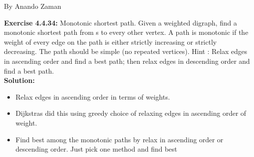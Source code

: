 \documentclass[11pt,fleqn]{article}
\begin{document}
By Anando Zaman


\textbf{Exercise 4.4.34:}  Monotonic shortest path. Given a weighted digraph, find a monotonic shortest
path from s to every other vertex. A path is monotonic if the weight of every edge on
the path is either strictly increasing or strictly decreasing. The path should be simple
(no repeated vertices). Hint : Relax edges in ascending order and find a best path; then
relax edges in descending order and find a best path.\\

\textbf{Solution:}

\begin{itemize}
	\item Relax edges in ascending order in terms of weights.
	\item Dijkstras did this using greedy choice of relaxing edges in ascending order of weight.
	\item Find best among the monotonic paths by relax in ascending order or descending order. Just pick one method and find best
\end{itemize}


	
\end{document}
